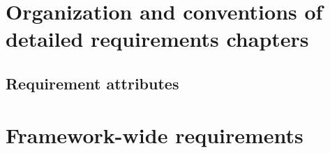 \documentclass[english]{article}
\newcommand{\shortname}{GR}
\begin{document}

\newpage






\section{Organization and conventions of detailed requirements chapters}


\subsection{Requirement attributes}


\newpage

\begin{htmlonly}
\end{htmlonly}
\section{Framework-wide requirements}

\setcounter{section}{0}
\renewcommand{\thesection}{\shortname\arabic{section}}
\renewcommand{\thesubsection}{\shortname\arabic{section}.\arabic{subsection}}
\renewcommand{\thesubsubsection}{\shortname\arabic{section}.\arabic{subsection}.\arabic{subsubsection}}



 

\end{document}
